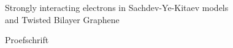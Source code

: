 \begin{titlepage} %

	\begin{center}
	
	\vspace*{\baselineskip} %
	
	
	
	
	{\huge Strongly interacting electrons in Sachdev-Ye-Kitaev models  \\ 
            and Twisted Bilayer Graphene\\} %
	
	
	
	
	
	
	\vspace*{4\baselineskip} %
	{\Large Proefschrift} 
	
	
	\vspace{6\baselineskip} %
	

\end{center}
\end{titlepage}
